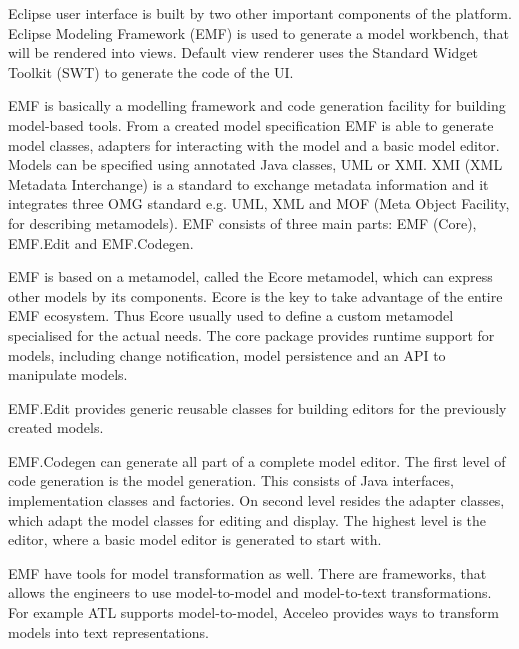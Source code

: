 Eclipse user interface is built by two other important components of the platform. Eclipse Modeling Framework (EMF) is used to generate a model workbench, that will be rendered into views. Default view renderer uses the Standard Widget Toolkit (SWT) to generate the code of the UI.

EMF is basically a modelling framework and code generation facility for building model-based tools. From a created model specification EMF is able to generate model classes, adapters for interacting with the model and a basic model editor.  Models can be specified using annotated Java classes, UML or XMI. XMI (XML Metadata Interchange) is a standard to exchange metadata information and it integrates three OMG standard e.g. UML, XML and MOF (Meta Object Facility, for describing metamodels). EMF consists of three main parts: EMF (Core), EMF.Edit and EMF.Codegen.

EMF is based on a metamodel, called the Ecore metamodel, which can express other models by its components. Ecore is the key to take advantage of the entire EMF ecosystem. Thus Ecore usually used to define a custom metamodel specialised for the actual needs. The core package provides runtime support for models, including change notification, model persistence and an API to manipulate models.

EMF.Edit provides generic reusable classes for building editors for the previously created models.

EMF.Codegen can generate all part of a complete model editor. The first level of code generation is the model generation. This consists of Java interfaces, implementation classes and factories. On second level resides the adapter classes, which adapt the model classes for editing and display. The highest level is the editor, where a basic model editor is generated to start with.

EMF have tools for model transformation as well. There are frameworks, that allows the engineers to use model-to-model and model-to-text transformations. For example ATL supports model-to-model, Acceleo \cite{acceleo} provides ways to transform models into text representations.



